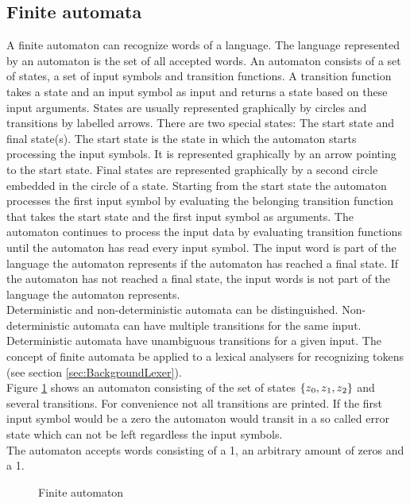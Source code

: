 \subsection{Finite automata}\label{sec:BackgroundAutomata}
A finite automaton can recognize words of a language.
The language represented by an automaton is the set of all accepted words.
An automaton consists of a set of states, a set of input symbols and transition functions.
A transition function takes a state and an input symbol as input and returns a state based on these input arguments.
States are usually represented graphically by circles and transitions by labelled arrows.
There are two special states: The start state and final state(s).
The start state is the state in which the automaton starts processing the input symbols.
It is represented graphically by an arrow pointing to the start state.
Final states are represented graphically by a second circle embedded in the circle of a state.
Starting from the start state the automaton processes the first input symbol by evaluating the belonging transition function that takes the start state and the first input symbol as arguments. The automaton continues to process the input data by evaluating transition functions until the automaton has read every input symbol. The input word is part of the language the automaton represents if the automaton has reached a final state. If the automaton has not reached a final state, the input words is not part of the language the automaton represents.\\
Deterministic and non-deterministic automata can be distinguished.
Non-deterministic automata can have multiple transitions for the same input.
Deterministic automata have unambiguous transitions for a given input.
The concept of finite automata be applied to a lexical analysers for recognizing tokens (see section \ref{sec:BackgroundLexer}). \cite{AutomataTheory.2007}\\
Figure \ref{fig:FiniteAutomaton} shows an automaton consisting of the set of states $\{z\textsubscript{0}, z\textsubscript{1}, z\textsubscript{2}\}$ and several transitions. For convenience not all transitions are printed.
If the first input symbol would be a zero the automaton would transit in a so called error state which can not be left regardless the input symbols.\\
The automaton accepts words consisting of a 1, an arbitrary amount of zeros and a 1.

\begin{figure}[H]
\centering
{}
\caption{Finite automaton}
\label{fig:FiniteAutomaton}
\end{figure}

